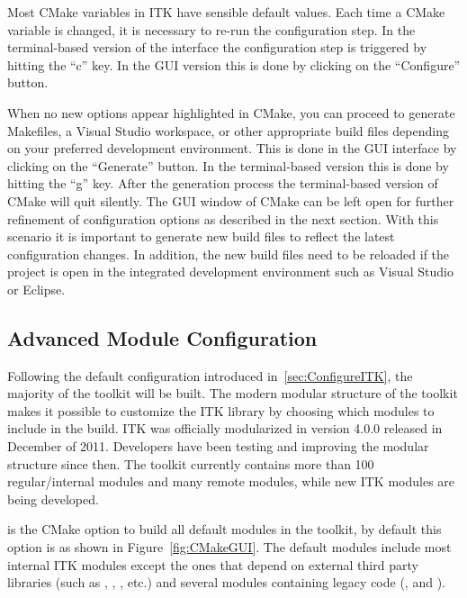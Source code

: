 Most CMake variables in ITK have sensible default values. Each time a CMake
variable is changed, it is necessary to re-run the configuration step. In the
terminal-based version of the interface the configuration step is triggered by
hitting the ``c'' key. In the GUI version this is done by clicking on the
``Configure'' button.

When no new options appear highlighted in CMake, you can proceed to generate
Makefiles, a Visual Studio workspace, or other appropriate build files depending
on your preferred development environment. This is done in the GUI interface by
clicking on the ``Generate'' button. In the terminal-based version this is done
by hitting the ``g'' key. After the generation process the terminal-based
version of CMake will quit silently. The GUI window of CMake can be left open
for further refinement of configuration options as described in the next
section. With this scenario it is important to generate new build files to
reflect the latest configuration changes. In addition, the new build files need
to be reloaded if the project is open in the integrated development environment
such as Visual Studio or Eclipse.

\subsection{Advanced Module Configuration}%
\label{sec:ModuleConfiguration}%
%

Following the default configuration introduced in~\ref{sec:ConfigureITK},
the majority of the toolkit will be built. The modern modular structure of the
toolkit makes it possible to customize the ITK library by choosing which modules
to include in the build. ITK was officially modularized in version 4.0.0
released in December of 2011. Developers have been testing and improving the
modular structure since then. The toolkit currently contains more than 100
regular/internal modules and many remote modules, while new ITK modules are
being developed.

 is the CMake option to build all default
modules in the toolkit, by default this option is  as shown in
Figure~\ref{fig:CMakeGUI}. The default modules include most internal ITK modules except
the ones that depend on external third party libraries (such as
, , , etc.)
and several modules containing legacy code (,
 and ).

